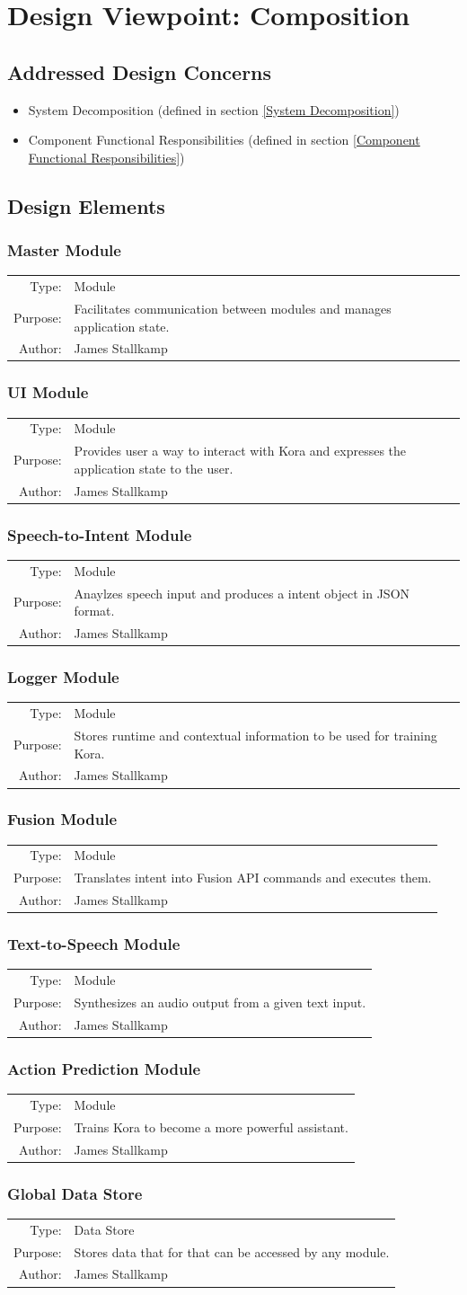 \documentclass[onecolumn, draftclsnofoot,10pt, compsoc]{IEEEtran}
\def \botname{Kora\xspace}
\newcommand{\designConcernRef}[1]{
    #1 (defined in section \ref{#1})
}
\newcommand{\designElementDef}[4]{
    \subsubsection{#1}\label{#1}
    \begin{tabular}[t]{r p{6in}}
        Type: & #2 \\
        Purpose: & #3 \\
        Author: & #4 \\
    \end{tabular}
}
\begin{document}
\section{Design Viewpoint: Composition}
    \subsection{Addressed Design Concerns}
        \begin{itemize}
            \item \designConcernRef{System Decomposition}
            \item \designConcernRef{Component Functional Responsibilities}
        \end{itemize}

    \subsection{Design Elements} 
        \designElementDef{Master Module}
                         {Module}
                         {Facilitates communication between modules and manages application state.}
                         {James Stallkamp}
        \designElementDef{UI Module}
                         {Module}
                         {Provides user a way to interact with \botname and expresses the application state to the user.}
                         {James Stallkamp}
        \designElementDef{Speech-to-Intent Module}
                         {Module}
                         {Anaylzes speech input and produces a intent object in JSON format.}
                         {James Stallkamp}
        \designElementDef{Logger Module}
                         {Module}
                         {Stores runtime and contextual information to be used for training \botname.}
                         {James Stallkamp}
        \designElementDef{Fusion Module}
                         {Module}
                         {Translates intent into Fusion API commands and executes them.}
                         {James Stallkamp}
        \designElementDef{Text-to-Speech Module}
                         {Module}
                         {Synthesizes an audio output from a given text input.}
                         {James Stallkamp}
        \designElementDef{Action Prediction Module}
                         {Module}
                         {Trains \botname to become a more powerful assistant.}
                         {James Stallkamp}
        \designElementDef{Global Data Store}
                         {Data Store}
                         {Stores data that for that can be accessed by any module.}
                         {James Stallkamp}
						 
\end{document}
